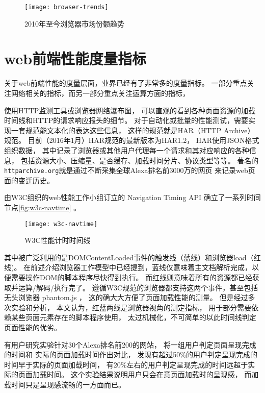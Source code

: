 \begin{figure}[htbp]
	\centering
	\texttt{[image: browser-trends]}
	\caption{2010年至今浏览器市场份额趋势}\label{fig:browser-trends}
\end{figure}


\section{web前端性能度量指标}

关于web前端性能的度量层面，业界已经有了非常多的度量指标。
一部分重点关注网络相关的指标，而另一部分重点关注运算方面的指标，

使用HTTP监测工具或浏览器网络瀑布图，
可以直观的看到各种页面资源的加载时间线和HTTP的请求响应报头的细节。
对于自动化或批量的性能测试，需要实现一套规范能文本化的表达这些信息，
这样的规范就是HAR（HTTP Archive）规范。
目前（2016年1月）HAR规范的最新版本为HAR1.2\cite{harspec}，
HAR使用JSON格式组织数据，
其中记录了浏览器或其他用户代理每一个请求和其对应响应的各种信息，
包括资源大小、压缩量、是否缓存、加载时间分片、协议类型等等。
著名的\texttt{httparchive.org}就是通过不断采集全球Alexa排名前3000万的网页
来记录web页面的变迁历史。

由W3C组织的web性能工作小组订立的 Navigation Timing API 确立了一系列时间节点\autoref{fig:w3c-navtime}\cite{w3cnavi} 。
\begin{figure}[htbp]
	\centering
	\texttt{[image: w3c-navtime]}
	\caption{W3C性能计时时间线}\label{fig:w3c-navtime}
\end{figure}
其中被广泛利用的是DOMContentLoaded事件的触发线（蓝线）和浏览器load（红线)。
在前述介绍浏览器工作模型中已经提到，蓝线仅意味着主文档解析完成，以便需要操作DOM的脚本程序尽快得到执行。
而红线则意味着所有的资源都已经获取并运算/解码/执行完了。
遵循W3C规范的浏览器都支持这两个事件，甚至包括无头浏览器 phantom.js ，
这的确大大方便了页面加载性能的测量。
但是经过多次实验和分析，
本文认为，红蓝两线是浏览器视角的测定指标，
用于部分需要依赖某些页面元素存在的脚本程序使用，
太过机械化，不可简单的以此时间线判定页面性能的优劣。

有用户研究实验\cite{balasubramanianweb}针对30个Alexa排名前200的网站，
将一组用户判定页面呈现完成的时间和
实际的页面加载时间作出对比，
发现有超过50\%的用户判定呈现完成的时间早于实际的页面加载时间，
有20\%左右的用户判定呈现完成的时间远超于实际的页面加载时间。
这个实验结果说明用户只会在意页面加载时的呈现感，
而加载时间只是呈现感流畅的一方面而已。


